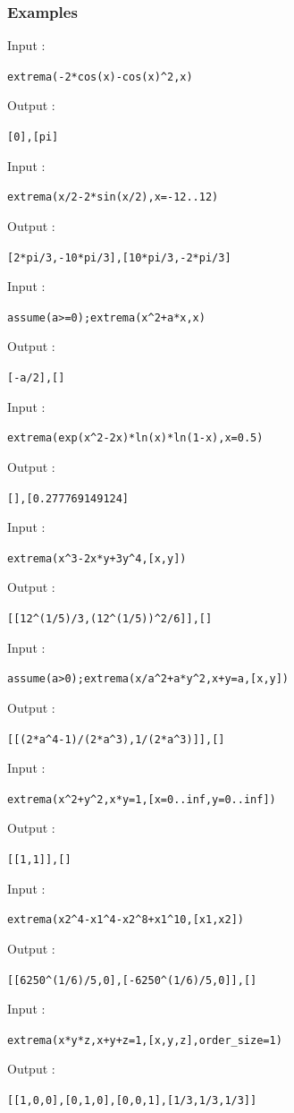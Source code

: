 \documentclass[a4paper,11pt]{book}
\begin{document}
\subsubsection{Examples}
Input :
\begin{center}
{\tt extrema(-2*cos(x)-cos(x)\verb|^|2,x)}
\end{center}
Output :
\begin{center}
{\tt [0],[pi]}
\end{center}
Input :
\begin{center}
{\tt extrema(x/2-2*sin(x/2),x=-12..12)}
\end{center}
Output :
\begin{center}
{\tt [2*pi/3,-10*pi/3],[10*pi/3,-2*pi/3]}
\end{center}
Input :
\begin{center}
{\tt assume(a>=0);extrema(x\verb|^|2+a*x,x)}
\end{center}
Output :
\begin{center}
{\tt [-a/2],[]}
\end{center}
Input :
\begin{center}
{\tt extrema(exp(x\verb|^|2-2x)*ln(x)*ln(1-x),x=0.5)}
\end{center}
Output :
\begin{center}
{\tt [],[0.277769149124]}
\end{center}
Input :
\begin{center}
{\tt extrema(x\verb|^|3-2x*y+3y\verb|^|4,[x,y])}
\end{center}
Output :
\begin{center}
{\tt [[12\verb|^|(1/5)/3,(12\verb|^|(1/5))\verb|^|2/6]],[]}
\end{center}
Input :
\begin{center}
{\tt assume(a>0);extrema(x/a\verb|^|2+a*y\verb|^|2,x+y=a,[x,y])}
\end{center}
Output :
\begin{center}
{\tt [[(2*a\verb|^|4-1)/(2*a\verb|^|3),1/(2*a\verb|^|3)]],[]}
\end{center}
Input :
\begin{center}
{\tt extrema(x\verb|^|2+y\verb|^|2,x*y=1,[x=0..inf,y=0..inf])}
\end{center}
Output :
\begin{center}
{\tt [[1,1]],[]}
\end{center}
Input :
\begin{center}
{\tt extrema(x2\verb|^|4-x1\verb|^|4-x2\verb|^|8+x1\verb|^|10,[x1,x2])}
\end{center}
Output :
\begin{center}
{\tt [[6250\verb|^|(1/6)/5,0],[-6250\verb|^|(1/6)/5,0]],[]}
\end{center}
Input :
\begin{center}
{\tt extrema(x*y*z,x+y+z=1,[x,y,z],order\_size=1)}
\end{center}
Output :
\begin{center}
{\tt [[1,0,0],[0,1,0],[0,0,1],[1/3,1/3,1/3]]}
\end{center}
\end{document}
